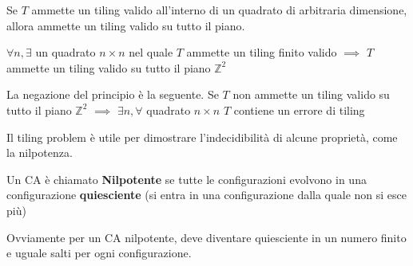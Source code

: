 \begin{definizione} 
    Se $T$ ammette un tiling valido all'interno di un quadrato di arbitraria
    dimensione, allora ammette un tiling valido su tutto il piano.

    $\forall n, \exists$ un quadrato $n\times n$ nel quale $T$ ammette un tiling
    finito valido $\implies$ $T$ ammette un tiling valido su tutto il piano $\mathbb{Z}^2$

\end{definizione}
\begin{nota}
    La negazione del principio è la seguente. Se $T$ non ammette un tiling valido
    su tutto il piano $\mathbb{Z}^2$ $\implies$ $\exists n, \forall$ quadrato $n\times n$ $T$
    contiene un errore di tiling
\end{nota}

Il tiling problem è utile per dimostrare l'indecidibilità di alcune proprietà, come
la nilpotenza.

\begin{definizione} 
    Un CA è chiamato \textbf{Nilpotente} se tutte le configurazioni evolvono
    in una configurazione \textbf{quiesciente} (si entra in una configurazione
    dalla quale non si esce più)
\end{definizione}

Ovviamente per un CA nilpotente, deve diventare quiesciente in un numero finito
e uguale salti per ogni configurazione.

